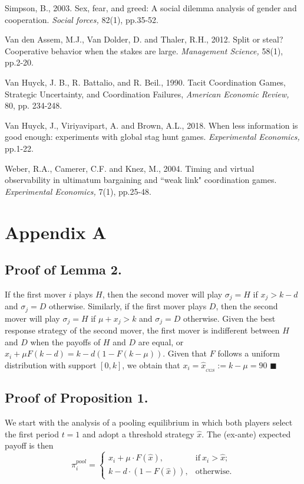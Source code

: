 \documentclass[12pt, letterpaper]{article}
\theoremstyle{plain}
\begin{document}
\begin{thebibliography}{10}
\bibitem{} Simpson, B., 2003. Sex, fear, and greed: A social dilemma analysis of gender and cooperation. \textit{Social forces,} 82(1), pp.35-52.

\bibitem{} Van den Assem, M.J., Van Dolder, D. and Thaler, R.H., 2012. Split or steal? Cooperative behavior when the stakes are large. \textit{Management Science,} 58(1), pp.2-20.

\bibitem{}  Van Huyck, J. B., R. Battalio, and R. Beil., 1990. Tacit Coordination Games, Strategic Uncertainty, and Coordination Failures, \textit{American Economic Review,} 80, pp. 234-248.

\bibitem{} Van Huyck, J., Viriyavipart, A. and Brown, A.L., 2018. When less information is good enough: experiments with global stag hunt games. \textit{Experimental Economics,} pp.1-22.

\bibitem{} Weber, R.A., Camerer, C.F. and Knez, M., 2004. Timing and virtual observability in ultimatum bargaining and ``weak link" coordination games. \textit{Experimental Economics,} 7(1), pp.25-48.


\end{thebibliography}

\newpage
\section*{Appendix A}

\subsection*{Proof of Lemma 2.}

If the first mover $i$ plays $H$, then the second mover will play $\sigma_j= H$ if $x_j> k-d$ and $\sigma_j= D$ otherwise. Similarly, if the first mover plays $D$, then the second mover will play $\sigma_j= H$ if $\mu+x_j> k$ and  $\sigma_j= D$ otherwise. Given the best response strategy of the second mover, the first mover is indifferent between $H$ and $D$ when the payoffs of $H$ and $D$ are equal, or $x_i + \mu F(k-d) = k - d(1-F(k-\mu))$. Given that $F$ follows a uniform distribution with support $[0,k]$, we obtain that $x_i=\hat{x}_{_{CGS}}:= k-\mu=90$ $\blacksquare$

\subsection*{Proof of Proposition 1.}

We start with the analysis of a pooling equilibrium in which both players select the first period $t=1$ and adopt a threshold strategy $\hat{x}$. The (ex-ante) expected payoff is then
\begin{equation}
   \pi^{pool}_{i} = 
   \begin{cases}
    x_i + \mu \cdot F(\hat{x}), &  \text{if} \  x_{i}> \hat{x};\\
    k - d \cdot (1-F(\hat{x})), & \text{otherwise}. 
   \end{cases}
   \label{pi_pool}
\end{equation}
\end{document}
